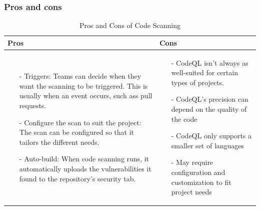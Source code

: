 \subsubsection{Pros and cons}
\begin{table}[H]
\centering
\begin{tabular}{|>{\raggedright\arraybackslash}p{6cm}|>{\raggedright\arraybackslash}p{6cm}|}
\hline
\textbf{Pros} & \textbf{Cons} \\
\hline
\begin{itemize}
\item [-] Triggers: Teams can decide when they want the scanning to be triggered. This is usually when an event occurs, such ass pull requests.
\item [-]Configure the scan to suit the project: The scan can be configured so that it tailors the 
  different needs. 
\item [-] Auto-build: When code scanning runs, it automatically uploads the vulnerabilities it found to the repository's security tab. 
\end{itemize}
&
   \begin{itemize}
\item [-] CodeQL isn't always as well-suited for certain types of projects. 
\item [-] CodeQL's precision can depend on the quality of the code
\item [-] CodeQL only supports a smaller set of languages 
\item [-] May require configuration and customization to fit project needs
\end{itemize}
\\
\hline
\end{tabular}
\caption{Pros and Cons of Code Scanning}
\label{tab: Code Scanning}
\end{table}


